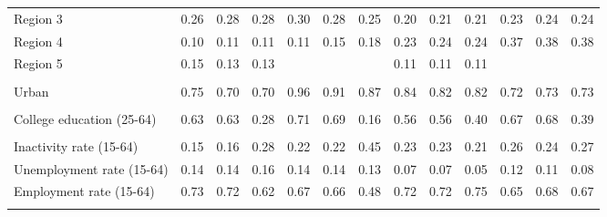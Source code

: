 \begin{tabular}{l*{12}{c}}
Region 3 & 0.26 & 0.28 & 0.28 & 0.30 & 0.28 & 0.25 & 0.20 & 0.21 & 0.21 & 0.23 & 0.24 & 0.24 \\
Region 4 & 0.10 & 0.11 & 0.11 & 0.11 & 0.15 & 0.18 & 0.23 & 0.24 & 0.24 & 0.37 & 0.38 & 0.38 \\
Region 5 & 0.15 & 0.13 & 0.13 & & & & 0.11 & 0.11 & 0.11 & & & \\
\\
Urban & 0.75 & 0.70 & 0.70 & 0.96 & 0.91 & 0.87 & 0.84 & 0.82 & 0.82 & 0.72 & 0.73 & 0.73 \\
\\
College education (25-64) & 0.63 & 0.63 & 0.28 & 0.71 & 0.69 & 0.16 & 0.56 & 0.56 & 0.40 & 0.67 & 0.68 & 0.39 \\
\\
Inactivity rate (15-64) & 0.15 & 0.16 & 0.28 & 0.22 & 0.22 & 0.45 & 0.23 & 0.23 & 0.21 & 0.26 & 0.24 & 0.27 \\
Unemployment rate (15-64) & 0.14 & 0.14 & 0.16 & 0.14 & 0.14 & 0.13 & 0.07 & 0.07 & 0.05 & 0.12 & 0.11 & 0.08 \\
Employment rate (15-64) & 0.73 & 0.72 & 0.62 & 0.67 & 0.66 & 0.48 & 0.72 & 0.72 & 0.75 & 0.65 & 0.68 & 0.67 \\
\\
\bottomrule
\end{tabular}